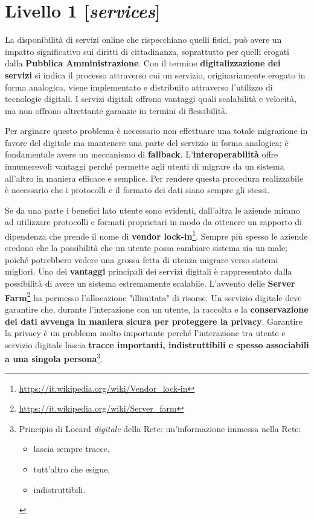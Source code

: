 \chapter{Livello 1 [\emph{services}]}
La disponibilità di servizi online che rispecchiano quelli fisici, può avere un impatto significativo sui diritti di cittadinanza, soprattutto per quelli erogati dalla \textbf{Pubblica Amministrazione}.
\bigbreak
Con il termine \textbf{digitalizzazione dei servizi} si indica il processo attraverso cui un servizio, originariamente erogato in forma analogica, viene implementato e distribuito attraverso l'utilizzo di tecnologie digitali. I servizi digitali offrono vantaggi quali scalabilità e velocità, ma non offrono altrettante garanzie in termini di flessibilità. 

Per arginare questo problema è necessario non effettuare una totale migrazione in favore del digitale ma mantenere una parte del servizio in forma analogica; è fondamentale avere un meccanismo di \textbf{fallback}.
\bigbreak
L'\textbf{interoperabilità} offre innumerevoli vantaggi perché permette agli utenti  di migrare da un sistema all'altro in maniera efficace e semplice. Per rendere questa procedura realizzabile è necessario che i protocolli e il formato dei dati siano sempre gli stessi.

Se da una parte i benefici lato utente sono evidenti, dall'altra le aziende mirano ad utilizzare protocolli e formati proprietari in modo da ottenere un rapporto di dipendenza che prende il nome di \textbf{vendor lock-in}\footnote{\url{https://it.wikipedia.org/wiki/Vendor_lock-in}}. Sempre più spesso le aziende credono che la possibilità che un utente possa cambiare sistema sia un male; poiché potrebbero vedere una grossa fetta di utenza migrare verso sistemi migliori.
\bigbreak
Uno dei \textbf{vantaggi} principali dei servizi digitali è rappresentato dalla possibilità di avere un sistema estremamente scalabile. L'avvento delle \textbf{Server Farm}\footnote{\url{https://it.wikipedia.org/wiki/Server_farm}} ha permesso l'allocazione "illimitata" di risorse.
\bigbreak
Un servizio digitale deve garantire che, durante l'interazione con un utente, la raccolta e la \textbf{conservazione dei dati avvenga in maniera sicura per proteggere la privacy}. 
Garantire la privacy è un problema molto importante perché l'interazione tra utente e servizio digitale lascia \textbf{tracce importanti, indistruttibili e spesso associabili a una singola persona}\footnote{Principio di Locard \emph{digitale} della Rete: un'informazione immessa nella Rete:\begin{itemize}
    \item lascia sempre tracce,
    \item tutt'altro che esigue,
    \item indistruttibili.
\end{itemize}}.


